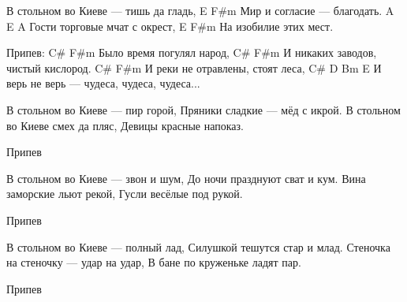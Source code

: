  
 
 
 
 
В стольном во Киеве — тишь да гладь,
                   E   F#m
Мир и согласие — благодать.
 A               E       A
Гости торговые мчат с окрест,
            E     F#m
На изобилие этих мест.

Припев:
    C#             F#m
   Было время погулял народ,
      C#                      F#m
   И никаких заводов, чистый кислород.
      C#                   F#m
   И реки не отравлены, стоят леса,
      C#                 D       Bm      E
   И верь не верь — чудеса, чудеса, чудеса...

В стольном во Киеве — пир горой,
Пряники сладкие — мёд с икрой.
В стольном во Киеве смех да пляс,
Девицы красные напоказ.

Припев

В стольном во Киеве — звон и шум,
До ночи празднуют сват и кум.
Вина заморские льют рекой,
Гусли весёлые под рукой.

Припев

В стольном во Киеве — полный лад,
Силушкой тешутся стар и млад.
Стеночка на стеночку — удар на удар,
В бане по круженьке ладят пар.

Припев
